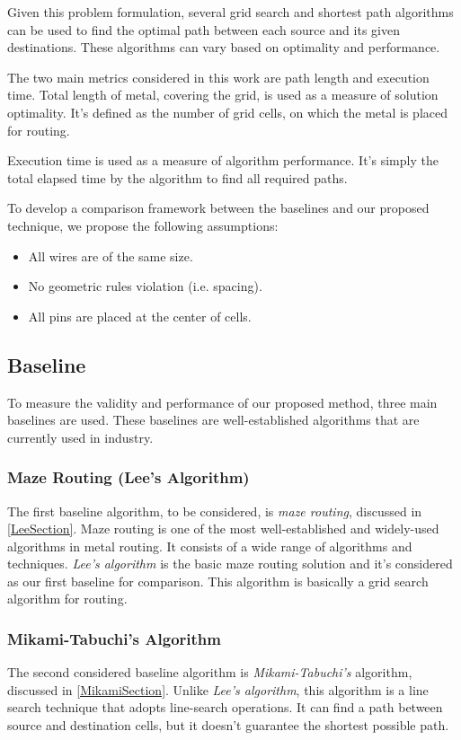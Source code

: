 Given this problem formulation, several grid search and shortest path algorithms can be used to find the optimal path between each source and its given destinations. These algorithms can vary based on optimality and performance.

The two main metrics considered in this work are path length and execution time. Total length of metal, covering the grid, is used as a measure of solution optimality. It's defined as the number of grid cells, on which the metal is placed for routing.

Execution time is used as a measure of algorithm performance. It's simply the total elapsed time by the algorithm to find all required paths.

To develop a comparison framework between the baselines and our proposed technique, we propose the following assumptions:
\begin{itemize}
    \item All wires are of the same size.
    \item No geometric rules violation (i.e. spacing).
    \item All pins are placed at the center of cells.
\end{itemize}

\subsection{Baseline}
To measure the validity and performance of our proposed method, three main baselines are used. These baselines are well-established algorithms that are currently used in industry.

\subsubsection{Maze Routing (Lee's Algorithm)}
The first baseline algorithm, to be considered, is \emph{maze routing}, discussed in \ref{LeeSection}. Maze routing is one of the most well-established and widely-used algorithms in metal routing. It consists of a wide range of algorithms and techniques. \emph{Lee's algorithm} is the basic maze routing solution and it's considered as our first baseline for comparison. This algorithm is basically a grid search algorithm for routing.

\subsubsection{Mikami-Tabuchi’s Algorithm}
The second considered baseline algorithm is \emph{Mikami-Tabuchi’s} algorithm, discussed in \ref{MikamiSection}. Unlike \emph{Lee's algorithm}, this algorithm is a line search technique that adopts line-search operations. It can find a path between source and destination cells, but it doesn't guarantee the shortest possible path.   

